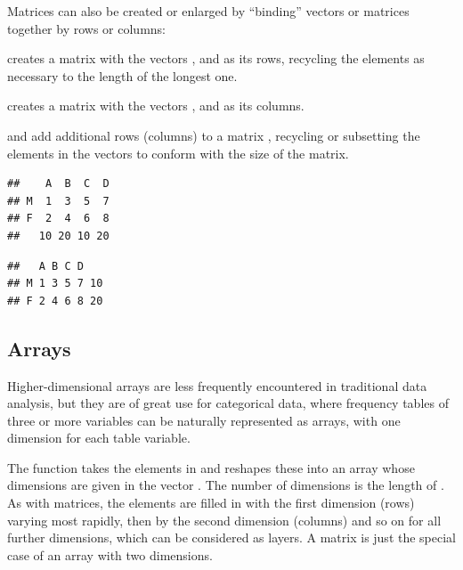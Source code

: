 \documentclass[11pt]{book}
\renewenvironment{knitrout}{\small\renewcommand{\baselinestretch}{.85}}{} %
\begin{document}
Matrices can also be created or enlarged by ``binding'' vectors or matrices together
by rows or columns:
\begin{itemize*}
  \item {} creates a matrix with the vectors ,  and  as its rows, recycling the elements as necessary to the length of the longest one.
  \item {} creates a matrix with the vectors ,  and  as its columns.
  \item {} and  add additional
  rows (columns) to a matrix , recycling or subsetting the elements in the
  vectors to conform with the size of the matrix.
\end{itemize*}

\begin{knitrout}
\color{fgcolor}\begin{kframe}
\begin{alltt}
 \hlstd{(}\hlstd{,}\hlstd{))}
\end{alltt}
\begin{verbatim}
##    A  B  C  D
## M  1  3  5  7
## F  2  4  6  8
##   10 20 10 20
\end{verbatim}
\begin{alltt}
 \hlstd{(}\hlstd{,}\hlstd{))}
\end{alltt}
\begin{verbatim}
##   A B C D   
## M 1 3 5 7 10
## F 2 4 6 8 20
\end{verbatim}
\end{kframe}
\end{knitrout}

\subsection{Arrays}
Higher-dimensional arrays are less frequently encountered in traditional data analysis,
but they are of great use for categorical data, where frequency tables of three or more
variables can be naturally represented as arrays, with one dimension for each
table variable.

The function  takes the elements in  and
reshapes these into an array whose dimensions are given in the vector .
The number of dimensions is the length of .  As with matrices, the
elements are filled in with the first dimension (rows) varying most rapidly,
then by the second dimension (columns) and so on for all further dimensions,
which can be considered as layers.
A matrix is just the special case of an array with two dimensions.
\end{document}
